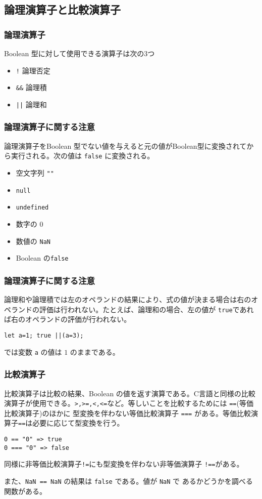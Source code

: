 \subsection{論理演算子と比較演算子}
\begin{frame}[containsverbatim]
 \frametitle{論理演算子}
Boolean 型に対して使用できる演算子は次の3つ
\begin{itemize}
 \item \Verb+!+ 論理否定
 \item \Verb+&&+ 論理積
 \item \Verb+||+ 論理和
\end{itemize}
\end{frame}
\begin{frame}[containsverbatim]
 \frametitle{論理演算子に関する注意}
論理演算子をBoolean 型でない値を与えると元の値がBoolean型に変換されてか
ら実行される。次の値は \Verb+false+ に変換される。
\begin{itemize}
 \item 空文字列 \Verb+""+
 \item \Verb+null+
 \item \Verb+undefined+
 \item 数字の $0$
 \item 数値の \Verb+NaN+
 \item Boolean の\Verb+false+
\end{itemize}
\end{frame}
\begin{frame}[containsverbatim]
 \frametitle{論理演算子に関する注意}
論理和や論理積では左のオペランドの結果により、式の値が決まる場合は右のオ
ペランドの評価は行われない。たとえば、論理和の場合、左の値が
\Verb+true+であれば右のオペランドの評価が行われない。
\begin{Verbatim}
let a=1; true ||(a=3); 
\end{Verbatim}
では変数 \Verb+a+ の値は $1$ のままである。
\end{frame}
\begin{frame}[containsverbatim]
 \frametitle{比較演算子}
比較演算子は比較の結果、Boolean の値を返す演算である。C言語と同様の比較
演算子が使用できる。\texttt{>,>=,<,<=}など。等しいことを比較するためには
\Verb+==+(等価比較演算子)のほかに 型変換を伴わない等価比較演算子
\Verb+===+ がある。等価比較演算子\texttt{==}は必要に応じて型変換を行う。
\begin{Verbatim}
0 == "0" => true
0 === "0" => false
\end{Verbatim}
同様に非等価比較演算子\texttt{!=}にも型変換を伴わない非等価演算子
\texttt{!==}がある。

 また、\Verb+NaN == NaN+ の結果は \Verb+false+ である。値が \Verb+NaN+ で
あるかどうかを調べる関数がある。
\end{frame}
